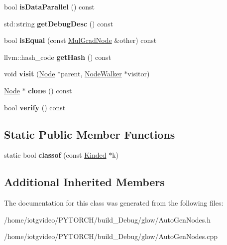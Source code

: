 \begin{DoxyCompactItemize}
bool {\bfseries is\+Data\+Parallel} () const
\item 
\mbox{\label{classglow_1_1_mul_grad_node_ab900e928d0636a6faba942895f6395ee}} 
std\+::string {\bfseries get\+Debug\+Desc} () const
\item 
\mbox{\label{classglow_1_1_mul_grad_node_a09f919c1534617260fc7018c111dff86}} 
bool {\bfseries is\+Equal} (const \hyperlink{classglow_1_1_mul_grad_node}{Mul\+Grad\+Node} \&other) const
\item 
\mbox{\label{classglow_1_1_mul_grad_node_ae41b964009998635f9e513092c424195}} 
llvm\+::hash\+\_\+code {\bfseries get\+Hash} () const
\item 
\mbox{\label{classglow_1_1_mul_grad_node_ab42b50e6ba934c805ba0cfea3051d8bf}} 
void {\bfseries visit} (\hyperlink{classglow_1_1_node}{Node} $\ast$parent, \hyperlink{classglow_1_1_node_walker}{Node\+Walker} $\ast$visitor)
\item 
\mbox{\label{classglow_1_1_mul_grad_node_a01b42e697ac84f15d8dab6d08ab8d570}} 
\hyperlink{classglow_1_1_node}{Node} $\ast$ {\bfseries clone} () const
\item 
\mbox{\label{classglow_1_1_mul_grad_node_a9ae7c9f388a904ad91c814b076777064}} 
bool {\bfseries verify} () const
\end{DoxyCompactItemize}
\subsection*{Static Public Member Functions}
\begin{DoxyCompactItemize}
\item 
\mbox{\label{classglow_1_1_mul_grad_node_a2dd9499d3b5b1d2edffc92f487f76be5}} 
static bool {\bfseries classof} (const \hyperlink{classglow_1_1_kinded}{Kinded} $\ast$k)
\end{DoxyCompactItemize}
\subsection*{Additional Inherited Members}


The documentation for this class was generated from the following files\+:\begin{DoxyCompactItemize}
\item 
/home/iotgvideo/\+P\+Y\+T\+O\+R\+C\+H/build\+\_\+\+Debug/glow/Auto\+Gen\+Nodes.\+h\item 
/home/iotgvideo/\+P\+Y\+T\+O\+R\+C\+H/build\+\_\+\+Debug/glow/Auto\+Gen\+Nodes.\+cpp\end{DoxyCompactItemize}
